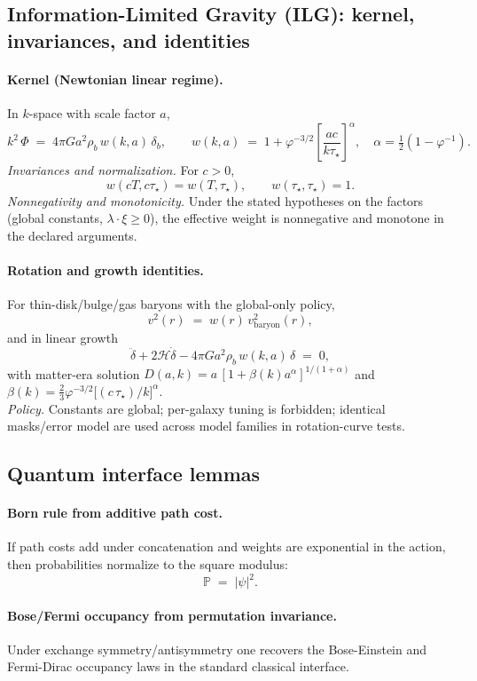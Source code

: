 \documentclass[11pt]{article}
\begin{document}
\subsection{Information-Limited Gravity (ILG): kernel, invariances, and identities}\label{subsec:ILG}

\paragraph{Kernel (Newtonian linear regime).}
In $k$-space with scale factor $a$,
\[
k^2\,\Phi \;=\; 4\pi G a^2 \rho_b\,w(k,a)\,\delta_b,\qquad
w(k,a) \;=\; 1 + \varphi^{-3/2}\!\left[\frac{a c}{k\tau_\star}\right]^{\alpha},
\quad \alpha=\tfrac12\!\left(1-\varphi^{-1}\right).
\]
\emph{Invariances and normalization.} For $c>0$,
\[
w(cT,c\tau_\star)=w(T,\tau_\star),\qquad w(\tau_\star,\tau_\star)=1.
\]
\emph{Nonnegativity and monotonicity.} Under the stated hypotheses on the factors (global constants, $\lambda\cdot\xi\ge 0$), the effective weight is nonnegative and monotone in the declared arguments. 

\paragraph{Rotation and growth identities.}
For thin-disk/bulge/gas baryons with the global-only policy,
\[
v^2(r) \;=\; w(r)\,v_{\mathrm{baryon}}^2(r),
\]
and in linear growth
\[
\ddot\delta + 2\mathcal{H}\dot\delta - 4\pi G a^2 \rho_b\,w(k,a)\,\delta \;=\; 0,
\]
with matter-era solution \(D(a,k)=a\,[1+\beta(k)a^{\alpha}]^{1/(1+\alpha)}\) and \(\beta(k)=\tfrac{2}{3}\varphi^{-3/2}\big[(c\,\tau_\star)/k\big]^{\alpha}\). \\
\emph{Policy.} Constants are global; per-galaxy tuning is forbidden; identical masks/error model are used across model families in rotation-curve tests. 

\subsection{Quantum interface lemmas}\label{subsec:quantum}

\paragraph{Born rule from additive path cost.}
If path costs add under concatenation and weights are exponential in the action, then probabilities normalize to the square modulus:
\[
\mathbb{P} \;=\; |\psi|^2 .
\]
\paragraph{Bose/Fermi occupancy from permutation invariance.}
Under exchange symmetry/antisymmetry one recovers the Bose-Einstein and Fermi-Dirac occupancy laws in the standard classical interface.
\end{document}
